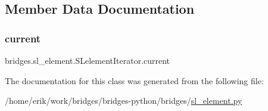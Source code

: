\subsection{Member Data Documentation}
\mbox{\label{classbridges_1_1sl__element_1_1_s_lelement_iterator_a073e2b7010880fcb17a505039f7a5eae}} 
\subsubsection{\texorpdfstring{current}{current}}
{\footnotesize\ttfamily bridges.\+sl\+\_\+element.\+S\+Lelement\+Iterator.\+current}



The documentation for this class was generated from the following file\+:\begin{DoxyCompactItemize}
\item 
/home/erik/work/bridges/bridges-\/python/bridges/\hyperlink{sl__element_8py}{sl\+\_\+element.\+py}\end{DoxyCompactItemize}
